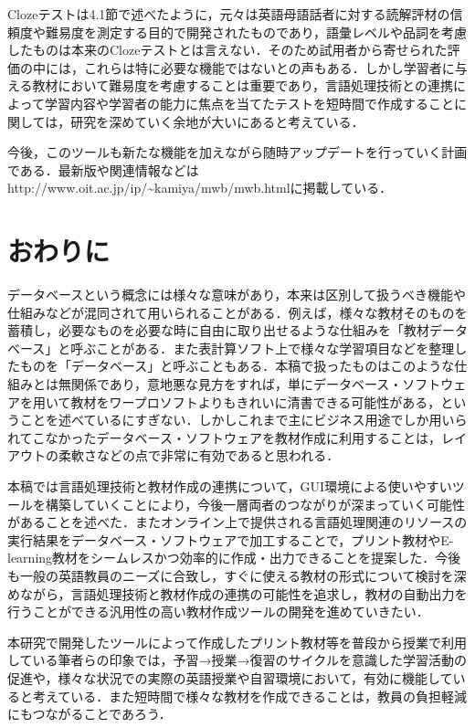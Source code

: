 \documentclass[japanese]{jnlp_1.4}
\begin{document}
Clozeテストは4.1節で述べたように，元々は英語母語話者に対する読解評材の信頼度や難易度を測定する目的で開発されたものであり，語彙レベルや品詞を考慮したものは本来のClozeテストとは言えない．そのため試用者から寄せられた評価の中には，これらは特に必要な機能ではないとの声もある．しかし学習者に与える教材において難易度を考慮することは重要であり，言語処理技術との連携によって学習内容や学習者の能力に焦点を当てたテストを短時間で作成することに関しては，研究を深めていく余地が大いにあると考えている．

今後，このツールも新たな機能を加えながら随時アップデートを行っていく計画である．最新版や関連情報などは http://www.oit.ac.jp/ip/\textasciitilde kamiya/mwb/mwb.htmlに掲載している．


\section{おわりに}

データベースという概念には様々な意味があり，本来は区別して扱うべき機能や仕組みなどが混同されて用いられることがある．例えば，様々な教材そのものを蓄積し，必要なものを必要な時に自由に取り出せるような仕組みを「教材データベース」と呼ぶことがある．また表計算ソフト上で様々な学習項目などを整理したものを「データベース」と呼ぶこともある．本稿で扱ったものはこのような仕組みとは無関係であり，意地悪な見方をすれば，単にデータベース・ソフトウェアを用いて教材をワープロソフトよりもきれいに清書できる可能性がある，ということを述べているにすぎない．しかしこれまで主にビジネス用途でしか用いられてこなかったデータベース・ソフトウェアを教材作成に利用することは，レイアウトの柔軟さなどの点で非常に有効であると思われる．

本稿では言語処理技術と教材作成の連携について，GUI環境による使いやすいツールを構築していくことにより，今後一層両者のつながりが深まっていく可能性があることを述べた．またオンライン上で提供される言語処理関連のリソースの実行結果をデータベース・ソフトウェアで加工することで，プリント教材やE-learning教材をシームレスかつ効率的に作成・出力できることを提案した．今後も一般の英語教員のニーズに合致し，すぐに使える教材の形式について検討を深めながら，言語処理技術と教材作成の連携の可能性を追求し，教材の自動出力を行うことができる汎用性の高い教材作成ツールの開発を進めていきたい．

本研究で開発したツールによって作成したプリント教材等を普段から授業で利用している筆者らの印象では，予習→授業→復習のサイクルを意識した学習活動の促進や，様々な状況での実際の英語授業や自習環境において，有効に機能していると考えている．また短時間で様々な教材を作成できることは，教員の負担軽減にもつながることであろう．
\end{document}

